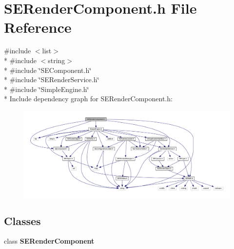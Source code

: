 \section{S\+E\+Render\+Component.\+h File Reference}
\label{_s_e_render_component_8h}
{\ttfamily \#include $<$list$>$}\\*
{\ttfamily \#include $<$string$>$}\\*
{\ttfamily \#include \char`\"{}S\+E\+Component.\+h\char`\"{}}\\*
{\ttfamily \#include \char`\"{}S\+E\+Render\+Service.\+h\char`\"{}}\\*
{\ttfamily \#include \char`\"{}Simple\+Engine.\+h\char`\"{}}\\*
Include dependency graph for S\+E\+Render\+Component.\+h\+:
\nopagebreak
\begin{figure}[H]
\begin{center}
\leavevmode
\includegraphics[width=350pt]{_s_e_render_component_8h__incl}
\end{center}
\end{figure}
\subsection*{Classes}
\begin{DoxyCompactItemize}
\item 
class {\bf S\+E\+Render\+Component}
\end{DoxyCompactItemize}
